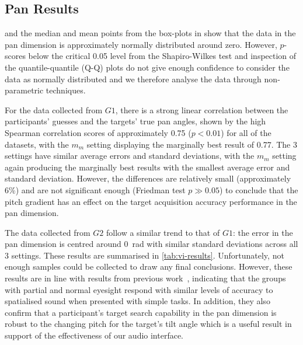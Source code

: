 \documentclass[sigconf, screen=true, anonymous=true]{acmart}
\begin{document}
\subsection{Pan Results}


 and the median and mean points from the box-plots in  show that the data in the pan dimension is approximately normally distributed around zero.
However, $p$-scores below the critical 0.05 level from the Shapiro-Wilkes test and inspection of the quantile-quantile (Q-Q) plots do not give enough confidence to consider the data as normally distributed and we therefore analyse the data through non-parametric techniques. 

For the data collected from $G1$, there is a strong linear correlation between the participants' guesses and the targets' true pan angles, shown by the high Spearman correlation scores of approximately 0.75 ($p < 0.01$) for all of the datasets, with the $m_m$ setting displaying the marginally best result of 0.77.
The 3 settings have similar average errors and standard deviations, with the $m_m$ setting again producing the marginally best results with the smallest average error and standard deviation.
However, the differences are relatively small (approximately 6\%) and are not significant enough (Friedman test $p \gg 0.05$) to conclude that the pitch gradient has an effect on the target acquisition accuracy performance in the pan dimension. 

The data collected from $G2$ follow a similar trend to that of $G1$: the error in the pan dimension is centred around \SI{0}{\radian} with similar standard deviations across all 3 settings.
These results are summarised in \cref{tab:vi-results}.
Unfortunately, not enough samples could be collected to draw any final conclusions.
However, these results are in line with results from previous work~\cite{zwiers2001spatial}, indicating that the groups with partial and normal eyesight respond with similar levels of accuracy to spatialised sound when presented with simple tasks. 
In addition, they also confirm that a participant's target search capability in the pan dimension is robust to the changing pitch for the target's tilt angle which is a useful result in support of the effectiveness of our audio interface.
\end{document}
